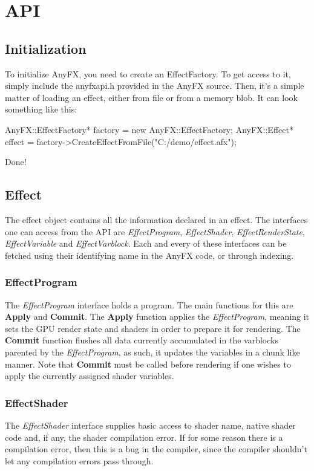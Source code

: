 \documentclass{article}
\begin{document}
\clearpage
\section{API}
\subsection{Initialization}
To initialize AnyFX, you need to create an EffectFactory. To get access to it, simply include the anyfxapi.h provided in the AnyFX source. Then, it's a simple matter of loading an effect, either from file or from a memory blob. It can look something like this:

\begin{CodeBox}
	AnyFX::EffectFactory* factory = new AnyFX::EffectFactory;
	AnyFX::Effect* effect = factory->CreateEffectFromFile("C:/demo/effect.afx");
\end{CodeBox}

Done!

\subsection{Effect}
The effect object contains all the information declared in an effect. The interfaces one can access from the API are \textit{EffectProgram}, \textit{EffectShader}, \textit{EffectRenderState}, \textit{EffectVariable} and \textit{EffectVarblock}. Each and every of these interfaces can be fetched using their identifying name in the AnyFX code, or through indexing.

\subsubsection{EffectProgram}
The \textit{EffectProgram} interface holds a program. The main functions for this are \textbf{Apply} and \textbf{Commit}. The \textbf{Apply} function applies the \textit{EffectProgram}, meaning it sets the GPU render state and shaders in order to prepare it for rendering. The \textbf{Commit} function flushes all data currently accumulated in the varblocks parented by the \textit{EffectProgram}, as such, it updates the variables in a chunk like manner. Note that \textbf{Commit} must be called before rendering if one wishes to apply the currently assigned shader variables.

\subsubsection{EffectShader}
The \textit{EffectShader} interface supplies basic access to shader name, native shader code and, if any, the shader compilation error. If for some reason there is a compilation error, then this is a bug in the compiler, since the compiler shouldn't let any compilation errors pass through. 
\end{document}
